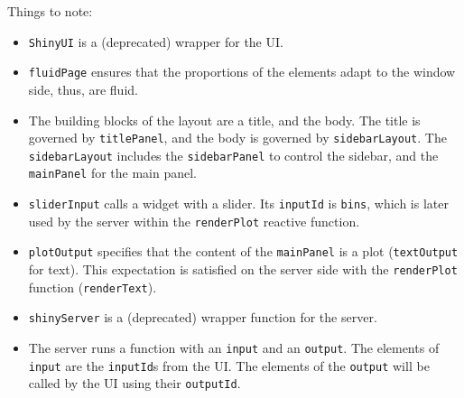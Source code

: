 \documentclass[]{book}
\newenvironment{Shaded}{\begin{snugshade}}{\end{snugshade}}
\newcommand{\CommentTok}[1]{\textcolor[rgb]{0.56,0.35,0.01}{\textit{#1}}}
\newcommand{\ControlFlowTok}[1]{\textcolor[rgb]{0.13,0.29,0.53}{\textbf{#1}}}
\newcommand{\DataTypeTok}[1]{\textcolor[rgb]{0.13,0.29,0.53}{#1}}
\newcommand{\DecValTok}[1]{\textcolor[rgb]{0.00,0.00,0.81}{#1}}
\newcommand{\KeywordTok}[1]{\textcolor[rgb]{0.13,0.29,0.53}{\textbf{#1}}}
\newcommand{\NormalTok}[1]{#1}
\newcommand{\OperatorTok}[1]{\textcolor[rgb]{0.81,0.36,0.00}{\textbf{#1}}}
\newcommand{\StringTok}[1]{\textcolor[rgb]{0.31,0.60,0.02}{#1}}
\providecommand{\tightlist}{%
  \setlength{\itemsep}{0pt}\setlength{\parskip}{0pt}}
\theoremstyle{definition}
\theoremstyle{definition}
\theoremstyle{definition}
\theoremstyle{remark}
\begin{document}
\begin{Shaded}
\end{Shaded}

Things to note:

\begin{itemize}
\tightlist
\item
  \texttt{ShinyUI} is a (deprecated) wrapper for the UI.
\item
  \texttt{fluidPage} ensures that the proportions of the elements adapt to the window side, thus, are fluid.
\item
  The building blocks of the layout are a title, and the body. The title is governed by \texttt{titlePanel}, and the body is governed by \texttt{sidebarLayout}. The \texttt{sidebarLayout} includes the \texttt{sidebarPanel} to control the sidebar, and the \texttt{mainPanel} for the main panel.
\item
  \texttt{sliderInput} calls a widget with a slider. Its \texttt{inputId} is \texttt{bins}, which is later used by the server within the \texttt{renderPlot} reactive function.
\item
  \texttt{plotOutput} specifies that the content of the \texttt{mainPanel} is a plot (\texttt{textOutput} for text). This expectation is satisfied on the server side with the \texttt{renderPlot} function (\texttt{renderText}).
\item
  \texttt{shinyServer} is a (deprecated) wrapper function for the server.
\item
  The server runs a function with an \texttt{input} and an \texttt{output}. The elements of \texttt{input} are the \texttt{inputId}s from the UI. The elements of the \texttt{output} will be called by the UI using their \texttt{outputId}.
\end{itemize}
\end{document}
